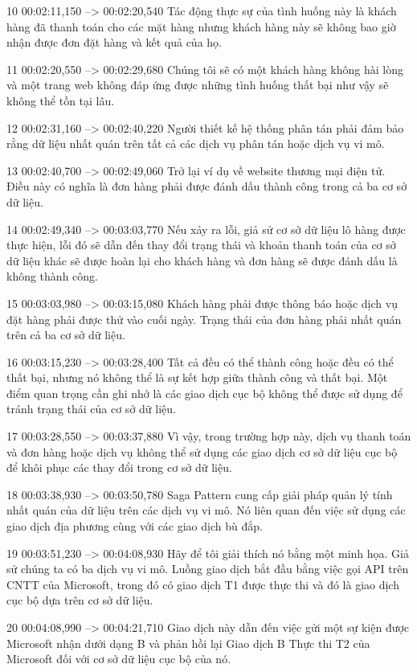 10
00:02:11,150 --> 00:02:20,540
Tác động thực sự của tình huống này là khách hàng đã thanh toán cho các mặt hàng nhưng khách hàng này sẽ không bao giờ nhận được đơn đặt hàng và kết quả của họ.

11
00:02:20,550 --> 00:02:29,680
Chúng tôi sẽ có một khách hàng không hài lòng và một trang web không đáp ứng được những tình huống thất bại như vậy sẽ không thể tồn tại lâu.

12
00:02:31,160 --> 00:02:40,220
Người thiết kế hệ thống phân tán phải đảm bảo rằng dữ liệu nhất quán trên tất cả các dịch vụ phân tán hoặc dịch vụ vi mô.

13
00:02:40,700 --> 00:02:49,060
Trở lại ví dụ về website thương mại điện tử.  Điều này có nghĩa là đơn hàng phải được đánh dấu thành công trong cả ba cơ sở dữ liệu.

14
00:02:49,340 --> 00:03:03,770
Nếu xảy ra lỗi, giả sử cơ sở dữ liệu lô hàng được thực hiện, lỗi đó sẽ dẫn đến thay đổi trạng thái và khoản thanh toán của cơ sở dữ liệu khác sẽ được hoàn lại cho khách hàng và đơn hàng sẽ được đánh dấu là không thành công.

15
00:03:03,980 --> 00:03:15,080
Khách hàng phải được thông báo hoặc dịch vụ đặt hàng phải được thử vào cuối ngày.  Trạng thái của đơn hàng phải nhất quán trên cả ba cơ sở dữ liệu.

16
00:03:15,230 --> 00:03:28,400
Tất cả đều có thể thành công hoặc đều có thể thất bại, nhưng nó không thể là sự kết hợp giữa thành công và thất bại.  Một điểm quan trọng cần ghi nhớ là các giao dịch cục bộ không thể được sử dụng để tránh trạng thái của cơ sở dữ liệu.

17
00:03:28,550 --> 00:03:37,880
Vì vậy, trong trường hợp này, dịch vụ thanh toán và đơn hàng hoặc dịch vụ không thể sử dụng các giao dịch cơ sở dữ liệu cục bộ để khôi phục các thay đổi trong cơ sở dữ liệu.

18
00:03:38,930 --> 00:03:50,780
Saga Pattern cung cấp giải pháp quản lý tính nhất quán của dữ liệu trên các dịch vụ vi mô.  Nó liên quan đến việc sử dụng các giao dịch địa phương cùng với các giao dịch bù đắp.

19
00:03:51,230 --> 00:04:08,930
Hãy để tôi giải thích nó bằng một minh họa.  Giả sử chúng ta có ba dịch vụ vi mô.  Luồng giao dịch bắt đầu bằng việc gọi API trên CNTT của Microsoft, trong đó có giao dịch T1 được thực thi và đó là giao dịch cục bộ dựa trên cơ sở dữ liệu.

20
00:04:08,990 --> 00:04:21,710
Giao dịch này dẫn đến việc gửi một sự kiện được Microsoft nhận dưới dạng B và phản hồi lại Giao dịch B Thực thi T2 của Microsoft đối với cơ sở dữ liệu cục bộ của nó.


